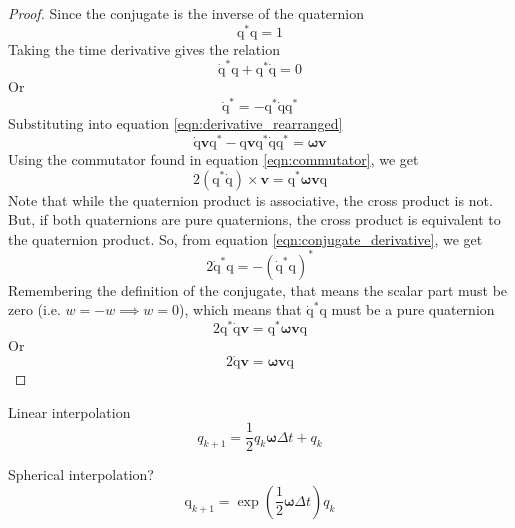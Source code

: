 \documentclass{amsart}
\theoremstyle{definition}
\theoremstyle{remark}
\numberwithin{equation}{section}
\begin{document}
\begin{proof}
  Since the conjugate is the inverse of the quaternion
  \begin{equation}
    \mathrm{q}^*\mathrm{q} =1
  \end{equation}
  Taking the time derivative gives the relation
  \begin{equation}
    \mathrm{\dot{q}}^*\mathrm{q} + \mathrm{q}^*\mathrm{\dot{q}} = 0
  \end{equation}
	Or
	\begin{equation}
		\mathrm{\dot{q}}^* = -\mathrm{q}^*\mathrm{\dot{q}}\mathrm{q}^* \label{eqn:conjugate_derivative}
	\end{equation}
	Substituting into equation \ref{eqn:derivative_rearranged}
	\begin{equation}
		\mathrm{\dot{q}}\mathbf{v}\mathrm{q}^*-\mathrm{q}\mathbf{v}\mathrm{q}^*\mathrm{\dot{q}}\mathrm{q}^*=\boldsymbol\omega\mathbf{v}
	\end{equation}
  Using the commutator found in equation \ref{eqn:commutator}, we get
	\begin{equation}
		2\left(\mathrm{q}^*\mathrm{\dot{q}}\right) \times \mathbf{v} = \mathrm{q}^* \boldsymbol\omega\mathbf{v}\mathrm{q}
	\end{equation}
	Note that while the quaternion product is associative, the cross product is not. But, if both quaternions are pure quaternions, the cross product is equivalent to the quaternion product. So, from equation \ref{eqn:conjugate_derivative}, we get
	\begin{equation}
		2\mathrm{\dot{q}}^*\mathrm{q} = - \left(\mathrm{\dot{q}}^*\mathrm{q}\right)^*
	\end{equation}
	Remembering the definition of the conjugate, that means the scalar part must be zero (i.e. $w=-w\implies w=0$), which means that $\mathrm{\dot{q}}^*\mathrm{q}$ must be a pure quaternion
	\begin{equation}
		2\mathrm{q}^*\mathrm{\dot{q}}\mathbf{v} = \mathrm{q}^*\boldsymbol\omega\mathbf{v}\mathrm{q}
	\end{equation}
	Or
	\begin{equation}
		2\mathrm{\dot{q}}\mathbf{v} =\boldsymbol\omega\mathbf{v}\mathrm{q}
	\end{equation}
  
\end{proof}

Linear interpolation
\begin{equation}
  q_{k+1} = \frac{1}{2}q_k\boldsymbol\omega\Delta t + q_k 
\end{equation}

Spherical interpolation?
\begin{equation}
  \mathrm{q}_{k+1} = \exp\left(\frac{1}{2} \boldsymbol\omega\Delta t\right)q_k
\end{equation}
\end{document}

